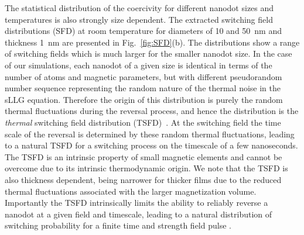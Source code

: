 \documentclass[aps,prb,signlecolumn,preprint,superscriptaddress,10]{revtex4-1}
\begin{document}
The statistical distribution of the  coercivity for different nanodot sizes and temperatures is also strongly size dependent. The extracted switching field distributions (SFD) at room temperature for diameters of 10 and 50~nm and thickness 1~nm are presented in Fig.~\ref{fig:SFD}(b). The distributions show a range of switching fields which is much larger for the smaller nanodot size. In the case of our simulations, each nanodot of a given size is identical in terms of the number of atoms and magnetic parameters, but with different pseudorandom number sequence representing the random nature of the thermal noise in the sLLG equation. Therefore the origin of this distribution is purely the random thermal fluctuations during the reversal process, and hence the distribution is the \emph{thermal} switching field distribution (TSFD)~\cite{Breth2012}. At the switching field the time scale of the reversal is determined by these random thermal fluctuations, leading to a natural TSFD for a switching process on the timescale of a few nanoseconds. The TSFD is an intrinsic property of small magnetic elements and cannot be overcome due to its intrinsic thermodynamic origin. We note that the TSFD is also thickness dependent, being narrower for thicker films due to the reduced thermal fluctuations associated with the larger magnetization volume. Importantly the TSFD intrinsically limits the ability to reliably reverse a nanodot at a given field and timescale, leading to a natural distribution of switching probability for a finite time and strength field pulse \cite{PhysRevB.94.014404}. 
\end{document}
